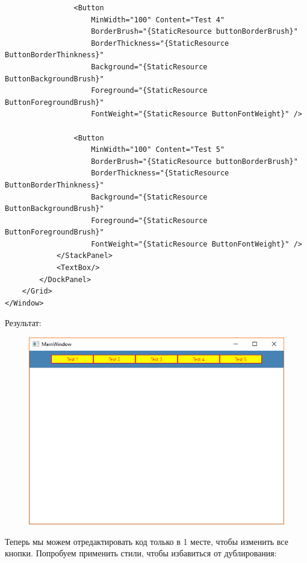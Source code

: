 \begin{verbatim}
                <Button
                    MinWidth="100" Content="Test 4" 
                    BorderBrush="{StaticResource buttonBorderBrush}"
                    BorderThickness="{StaticResource ButtonBorderThinkness}"
                    Background="{StaticResource ButtonBackgroundBrush}"
                    Foreground="{StaticResource ButtonForegroundBrush}"
                    FontWeight="{StaticResource ButtonFontWeight}" />

                <Button
                    MinWidth="100" Content="Test 5" 
                    BorderBrush="{StaticResource buttonBorderBrush}"
                    BorderThickness="{StaticResource ButtonBorderThinkness}"
                    Background="{StaticResource ButtonBackgroundBrush}"
                    Foreground="{StaticResource ButtonForegroundBrush}"
                    FontWeight="{StaticResource ButtonFontWeight}" />
            </StackPanel>
            <TextBox/>
        </DockPanel>
    </Grid>
</Window>
\end{verbatim}

Результат:
\begin{figure}[H]
\centering
\includegraphics[width=1\textwidth]{resources_step1.png}
\end{figure}

Теперь мы можем отредактировать код только в 1 месте, чтобы изменить все кнопки. Попробуем применить стили, чтобы избавиться от дублирования:

\newpage


